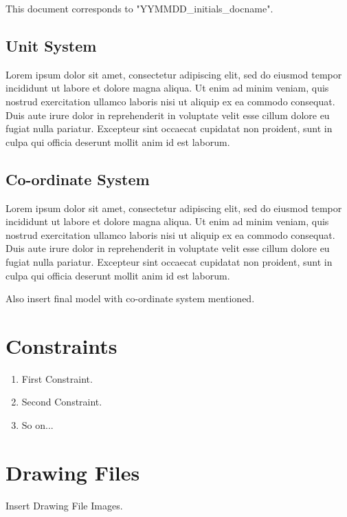 \documentclass[12pt, a4paper, oneside]{book}
\begin{document}
\vspace*{1\baselineskip}

This document corresponds to "YYMMDD\_initials\_docname".

\section{Unit System}
Lorem ipsum dolor sit amet, consectetur adipiscing elit, sed do eiusmod tempor incididunt ut labore et dolore magna aliqua. Ut enim ad minim veniam, quis nostrud exercitation ullamco laboris nisi ut aliquip ex ea commodo consequat. Duis aute irure dolor in reprehenderit in voluptate velit esse cillum dolore eu fugiat nulla pariatur. Excepteur sint occaecat cupidatat non proident, sunt in culpa qui officia deserunt mollit anim id est laborum.

\section{Co-ordinate System}
Lorem ipsum dolor sit amet, consectetur adipiscing elit, sed do eiusmod tempor incididunt ut labore et dolore magna aliqua. Ut enim ad minim veniam, quis nostrud exercitation ullamco laboris nisi ut aliquip ex ea commodo consequat. Duis aute irure dolor in reprehenderit in voluptate velit esse cillum dolore eu fugiat nulla pariatur. Excepteur sint occaecat cupidatat non proident, sunt in culpa qui officia deserunt mollit anim id est laborum.

Also insert final model with co-ordinate system mentioned.

\chapter{Constraints }

\begin{enumerate}
  \item First Constraint.
  \item Second Constraint.
  \item So on...
\end{enumerate}

\chapter{Drawing Files}
Insert Drawing File Images.
\end{document}
